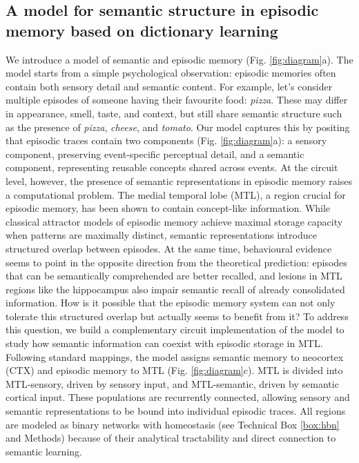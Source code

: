 \documentclass{article}
\begin{document}
\subsection*{A model for semantic structure in episodic memory based on dictionary learning}
We introduce a model of semantic and episodic memory (Fig. \ref{fig:diagram}a). The model starts from a simple psychological observation: episodic memories often contain both sensory detail and semantic content. For example, let's consider multiple episodes of someone having their favourite food: \textit{pizza}. These may differ in appearance, smell, taste, and context, but still share semantic structure such as the presence of \textit{pizza}, \textit{cheese}, and \textit{tomato}. Our model captures this by positing that episodic traces contain two components (Fig. \ref{fig:diagram}a): a sensory component, preserving event-specific perceptual detail, and a semantic component, representing reusable concepts shared across events.
\newline\newline
At the circuit level, however, the presence of semantic representations in episodic memory raises a computational problem. The medial temporal lobe (MTL), a region crucial for episodic memory, has been shown to contain concept-like information. While classical attractor models of episodic memory achieve maximal storage capacity when patterns are maximally distinct, semantic representations introduce structured overlap between episodes. At the same time, behavioural evidence seems to point in the opposite direction from the theoretical prediction: episodes that can be semantically comprehended are better recalled, and lesions in MTL regions like the hippocampus also impair semantic recall of already consolidated information. How is it possible that the episodic memory system can not only tolerate this structured overlap but actually seems to benefit from it? To address this question, we build a complementary circuit implementation of the model to study how semantic information can coexist with episodic storage in MTL. Following standard mappings, the model assigns semantic memory to neocortex (CTX) and episodic memory to MTL (Fig. \ref{fig:diagram}c). MTL is divided into MTL-sensory, driven by sensory input, and MTL-semantic, driven by semantic cortical input. These populations are recurrently connected, allowing sensory and semantic representations to be bound into individual episodic traces. All regions are modeled as binary networks with homeostasis (see Technical Box \ref{box:hbn} and Methods) because of their analytical tractability and direct connection to semantic learning.
\end{document}
